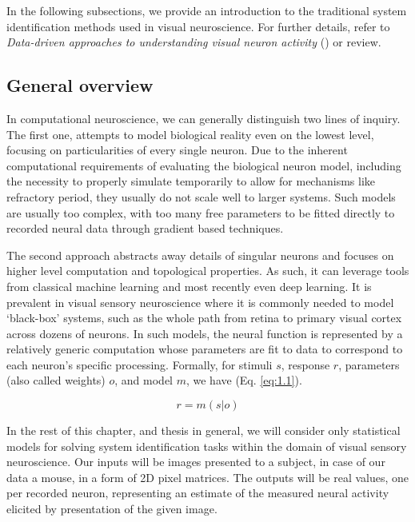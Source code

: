 In the following subsections, we provide an introduction to the traditional system identification methods used in visual neuroscience. For further details, refer to \textit{Data-driven approaches to understanding visual neuron activity} (\cite{doi:10.1146/annurev-vision-091718-014731}) or \cite{Carandini10577} review.

\subsection{General overview}

In computational neuroscience, we can generally distinguish two lines of inquiry. The first one, attempts to model biological reality even on the lowest level, focusing on particularities of every single neuron. Due to the inherent computational requirements of evaluating the biological neuron model, including the necessity to properly simulate temporarily to allow for mechanisms like refractory period, they usually do not scale well to larger systems. Such models are usually too complex, with too many free parameters to be fitted directly to recorded neural data through gradient based techniques. 

The second approach abstracts away details of singular neurons and focuses on higher level computation and topological properties. As such, it can leverage tools from classical machine learning and most recently even deep learning. It is prevalent in visual sensory neuroscience where it is commonly needed to model ‘black-box’ systems, such as the whole path from retina to primary visual cortex across dozens of neurons. In such models, the neural function is represented by a relatively generic computation whose parameters are fit to data to correspond to each neuron’s specific processing. Formally, for stimuli $s$, response $r$, parameters (also called weights) $o$, and model $m$, we have (Eq. \ref{eq:1.1}).

\begin{equation}\label{eq:1.1}
    r=m(s|o)
\end{equation}

In the rest of this chapter, and thesis in general, we will consider only statistical models for solving system identification tasks within the domain of visual sensory neuroscience. Our inputs will be images presented to a subject, in case of our data a mouse, in a form of 2D pixel matrices. The outputs will be real values, one per recorded neuron, representing an estimate of the measured neural activity elicited by presentation of the given image.

